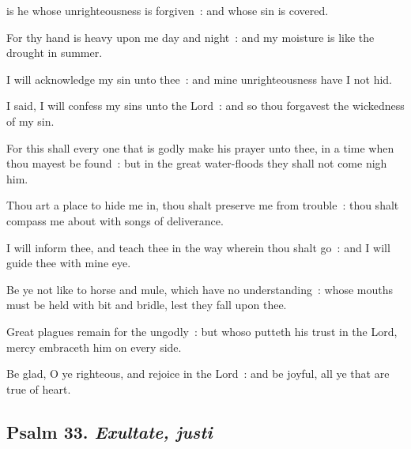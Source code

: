  is he whose unrighteousness is forgiven~: and whose sin is covered.\par
{}
For thy hand is heavy upon me day and night~: and my moisture is like the drought in summer.\par
{}I will acknowledge my sin unto thee~: and mine unrighteousness have I not hid.\par
{}I said, I will confess my sins unto the Lord~: and so thou forgavest the wickedness of my sin.\par
{}For this shall every one that is godly make his prayer unto thee, in a time when thou mayest be found~: but in the great water-floods they shall not come nigh him.\par
{}Thou art a place to hide me in, thou shalt preserve me from trouble~: thou shalt compass me about with songs of deliverance.\par
{}I will inform thee, and teach thee in the way wherein thou shalt go~: and I will guide thee with mine eye.\par
{}Be ye not like to horse and mule, which have no understanding~: whose mouths must be held with bit and bridle, lest they fall upon thee.\par
{}Great plagues remain for the ungodly~: but whoso putteth his trust in the Lord, mercy embraceth him on every side.\par
{}Be glad, O ye righteous, and rejoice in the Lord~: and be joyful, all ye that are true of heart.\par

\subsection{Psalm 33. \textit{Exultate, justi}}

